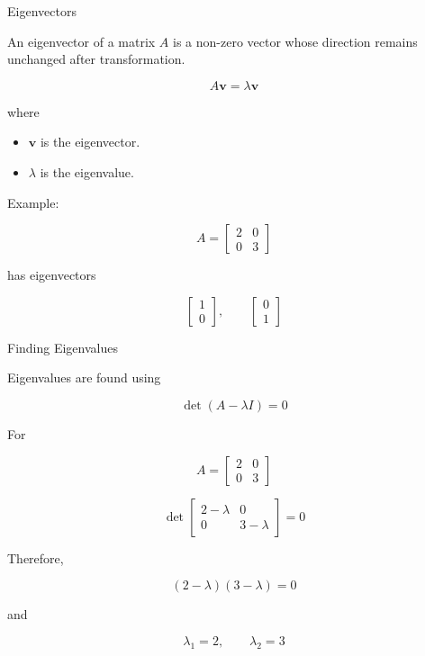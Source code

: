 \documentclass[aspectratio=169]{beamer}
\begin{document}
\begin{frame}{Eigenvectors}
\small

An eigenvector of a matrix $A$ is a non-zero vector whose direction remains unchanged after transformation.

$$
A\mathbf{v}=\lambda\mathbf{v}
$$

where

\begin{itemize}
\item $\mathbf{v}$ is the eigenvector.
\item $\lambda$ is the eigenvalue.
\end{itemize}

Example:

$$
A=
\begin{bmatrix}
2&0\\
0&3
\end{bmatrix}
$$

has eigenvectors

$$
\begin{bmatrix}
1\\
0
\end{bmatrix},
\qquad
\begin{bmatrix}
0\\
1
\end{bmatrix}
$$

\end{frame}

\begin{frame}{Finding Eigenvalues}
\small

Eigenvalues are found using

$$
\det(A-\lambda I)=0
$$

For

$$
A=
\begin{bmatrix}
2&0\\
0&3
\end{bmatrix}
$$

$$
\det
\begin{bmatrix}
2-\lambda&0\\
0&3-\lambda
\end{bmatrix}
=0
$$

Therefore,

$$
(2-\lambda)(3-\lambda)=0
$$

and

$$
\boxed{\lambda_1=2,\qquad\lambda_2=3}
$$

\end{frame}
\end{document}
